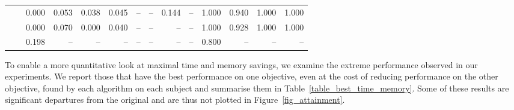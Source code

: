\begin{table*}[htb]
{\begin{tabular}{|l|l|r|r|r|r|r|r|r|r|r|r|r|r|}
\multirow{2}{*}{\dr{}}              & \sn{}        & 0.000                     & 0.053                     & 0.038                     & 0.045                    & --                        & --                        & 0.144                     & --                       & 1.000                     & 0.940                     & 1.000                     & 1.000                    \\
                                   & \sr{}        & 0.000                     & 0.070                     & 0.000                     & 0.040                    & --                        & --                        & --                        & --                       & 1.000                     & 0.928                     & 1.000                     & 1.000                    \\ \hline
\multicolumn{1}{|c|}{\sn{}}         & \sr{}        & 0.198                     & --                        & --                        & --                       & --                        & --                        & --                        & --                       & 0.800                     & --                        & --                        & --                       \\ \hline
\end{tabular}
}
\vspace{-1em}
\end{table*}

To enable a more quantitative look at maximal time and memory savings, we
examine the extreme performance observed in our experiments. We report
those that have the best performance on
one objective, even at the cost of reducing performance on the other
objective, found by each
algorithm on each subject and summarise them in Table~\ref{table_best_time_memory}.
Some of these results are significant
departures from the original and are thus not plotted in Figure~\ref{fig_attainment}. 

